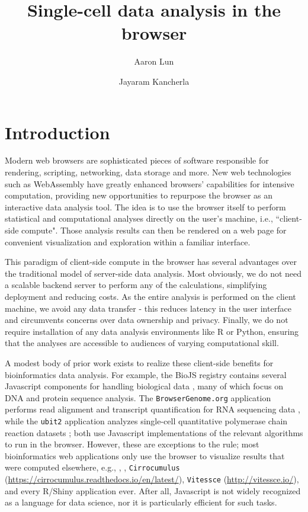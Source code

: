 \documentclass{article}
\title{Single-cell data analysis in the browser}
\author[1]{Aaron Lun}
\affil[1]{Genentech, Inc. South San Francisco, CA}
\author[1]{Jayaram Kancherla}
\begin{document}
\maketitle

\newcommand{\code}[1]{\texttt{#1}}
\newcommand{\jay}[1]{\textcolor{red}{#1}}

\section{Introduction}

Modern web browsers are sophisticated pieces of software responsible for rendering, scripting, networking, data storage and more.
New web technologies such as WebAssembly \cite{haas2017bringing} have greatly enhanced browsers' capabilities for intensive computation,
providing new opportunities to repurpose the browser as an interactive data analysis tool.
The idea is to use the browser itself to perform statistical and computational analyses directly on the user's machine, i.e., ``client-side compute". 
Those analysis results can then be rendered on a web page for convenient visualization and exploration within a familiar interface.

This paradigm of client-side compute in the browser has several advantages over the traditional model of server-side data analysis.
Most obviously, we do not need a scalable backend server to perform any of the calculations, simplifying deployment and reducing costs.
As the entire analysis is performed on the client machine, we avoid any data transfer - this reduces latency in the user interface and circumvents concerns over data ownership and privacy.
Finally, we do not require installation of any data analysis environments like R or Python, ensuring that the analyses are accessible to audiences of varying computational skill.

A modest body of prior work exists to realize these client-side benefits for bioinformatics data analysis.
For example, the BioJS registry contains several Javascript components for handling biological data \cite{gomez2013biojs}, many of which focus on DNA and protein sequence analysis.
The \code{BrowserGenome.org} application performs read alignment and transcript quantification for RNA sequencing data \cite{schmid2015browsergenome},
while the \code{ubit2} application analyzes single-cell quantitative polymerase chain reaction datasets \cite{fan2017ubit2};
both use Javascript implementations of the relevant algorithms to run in the browser.
However, these are exceptions to the rule; most bioinformatics web applications only use the browser to visualize results that were computed elsewhere,
e.g., \cite{megill2021cellxgene}, \cite{chelaru2014epiviz}, \code{Cirrocumulus} (\url{https://cirrocumulus.readthedocs.io/en/latest/}), \code{Vitessce} (\url{http://vitessce.io/}), \cite{kerpedjiev2018higlass} and every R/Shiny application ever.
After all, Javascript is not widely recognized as a language for data science, nor it is particularly efficient for such tasks.
\end{document}

